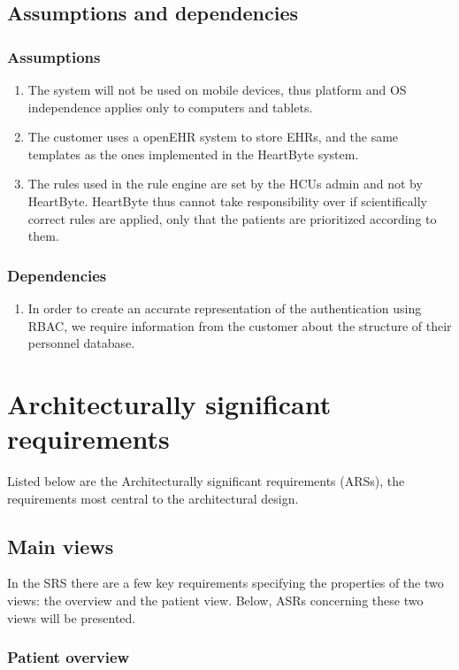 \documentclass{article}
\begin{document}
\subsection{Assumptions and dependencies}
\subsubsection{Assumptions}
\begin{enumerate}[label=(\roman*)]
\item The system will not be used on mobile devices, thus platform and OS independence applies only to computers and tablets. 
\item The customer uses a openEHR system to store EHRs, and the same templates as the ones implemented in the HeartByte system.
\item The rules used in the rule engine are set by the HCUs admin and not by HeartByte. HeartByte thus cannot take responsibility over if scientifically correct rules are applied, only that the patients are prioritized according to them.
\end{enumerate}
\subsubsection{Dependencies}
\begin{enumerate}[label=(\roman*)]
\item In order to create an accurate representation of the authentication using RBAC, we require information from the customer about the structure of their personnel database.

\end{enumerate}

\section{Architecturally significant requirements}
Listed below are the Architecturally significant requirements (ARSs), the requirements most central to the architectural design. 

\subsection{Main views}
In the SRS there are a few key requirements specifying the properties of the two views: the overview and the patient view. Below, ASRs concerning these two views will be presented.

\subsubsection{Patient overview}
\end{document}
